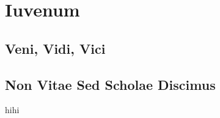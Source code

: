 \section{Iuvenum}

\blindtext

\subsection{Veni, Vidi, Vici}

\blindtext

\subsection{Non Vitae Sed Scholae Discimus}

\blindtext {} hihi

\blindtext